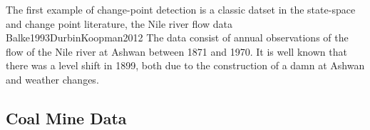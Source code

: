 \documentclass{article}
\begin{document}
The first example of change-point detection is a classic datset in the state-space and change point literature, the Nile river flow data \textcite{Cobb1978}{Balke1993}{DurbinKoopman2012}
The data consist of annual observations of the flow of the Nile river at Ashwan between 1871 and 1970. 
It is well known that there was a level shift in 1899, both due to the construction of a damn at Ashwan and weather changes.

\subsection{Coal Mine Data}
\label{sec:coal-mine-data}



\printbibliography{}
\end{document}
